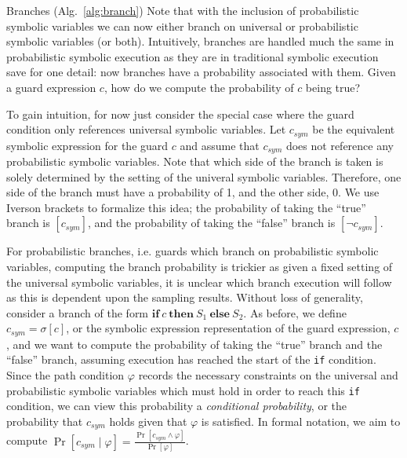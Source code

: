 \documentclass[acmsmall,review]{acmart}\settopmatter{}
\begin{document}
	\begin{paragraph}{Branches (Alg.~\ref{alg:branch})}
		Note that with the inclusion of probabilistic symbolic variables we can now either branch on universal or probabilistic symbolic variables (or both).
		Intuitively, branches are handled much the same in probabilistic symbolic execution as they are in traditional symbolic execution save for one detail: now branches have a probability associated with them.
		Given a guard expression $c$, how do we compute the probability of $c$ being true?
		
		
		To gain intuition, for now just consider the special case where the guard condition only references universal symbolic variables.
		Let $c_{sym}$ be the equivalent symbolic expression for the guard $c$ and assume that $c_{sym}$ does not reference any probabilistic symbolic variables.
		Note that which side of the branch is taken is solely determined by the setting of the univeral symbolic variables.
		Therefore, one side of the branch must have a probability of 1, and the other side, 0.
		We use Iverson brackets to formalize this idea; the probability of taking the ``true'' branch is $[c_{sym}]$, and the probability of taking the ``false'' branch is $[\neg c_{sym}]$.
		
		
		For probabilistic branches, i.e. guards which branch on probabilistic symbolic variables, computing the branch probability is trickier as given a fixed setting of the universal symbolic variables, it is unclear which branch execution will follow as this is dependent upon the sampling results.
		Without loss of generality, consider a branch of the form $\mathbf{if}~c~\mathbf{then}~S_1~\mathbf{else}~S_2$.
		As before, we define $c_{sym} = \sigma[c]$, or the symbolic expression representation of the guard expression, $c$, and we want to compute the probability of taking the ``true'' branch and the ``false'' branch, assuming execution has reached the start of the \texttt{if} condition.
		Since the path condition $\varphi$ records the necessary constraints on the universal and probabilistic symbolic variables which must hold in order to reach this \texttt{if} condition, we can view this probability a \textit{conditional probability}, or the probability that $c_{sym}$ holds given that $\varphi$ is satisfied.
		In formal notation, we aim to compute $\Pr[c_{sym} \mid \varphi] = \frac{\Pr[c_{sym}\wedge \varphi]}{\Pr[\varphi]}$.
		

\end{paragraph}
\end{document}
